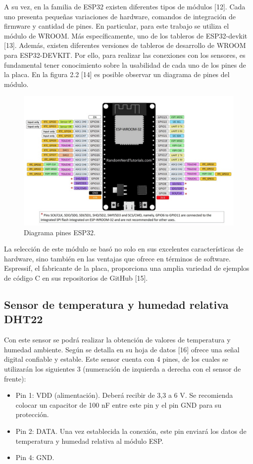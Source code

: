A su vez, en la familia de ESP32 existen diferentes tipos de módulos [12]. Cada uno presenta pequeñas variaciones de hardware, comandos de integración de firmware y cantidad de pines. En particular, para este trabajo se utiliza el módulo de WROOM. Más específicamente, uno de los tableros de ESP32-devkit [13]. Además, existen diferentes versiones de tableros de desarrollo de WROOM para ESP32-DEVKIT. Por ello, para realizar las conexiones con los sensores, es fundamental tener conocimiento sobre la usabilidad de cada uno de los pines de la placa. En la figura 2.2 [14] es posible observar un diagrama de pines del módulo.\\

\begin{figure}[htpb]
\centering 
\includegraphics[width=.9\textwidth]{./Figures/esp32pines.png}
\caption{Diagrama pines ESP32.}
\label{fig:diagBloques}
\end{figure}

La selección de este módulo se basó no solo en sus excelentes características de hardware, sino también en las ventajas que ofrece en términos de software. Espressif, el fabricante de la placa, proporciona una amplia variedad de ejemplos de código C en sus repositorios de GitHub [15].\\

\subsection{Sensor de temperatura y humedad relativa DHT22}
Con este sensor se podrá realizar la obtención de valores de temperatura y humedad ambiente. Según se detalla en su hoja de datos [16] ofrece una señal digital confiable y estable.
Este sensor cuenta con 4 pines, de los cuales se utilizarán los siguientes 3 (numeración de izquierda a derecha con el sensor de frente):
\begin{itemize}
\item Pin 1: VDD (alimentación). Deberá recibir de 3,3 a 6 V. Se recomienda colocar un capacitor de 100 nF entre este pin y el pin GND para su protección.
\item Pin 2: DATA. Una vez establecida la conexión, este pin enviará los datos de temperatura y humedad relativa al módulo ESP.
\item Pin 4: GND.\\
\end{itemize}

